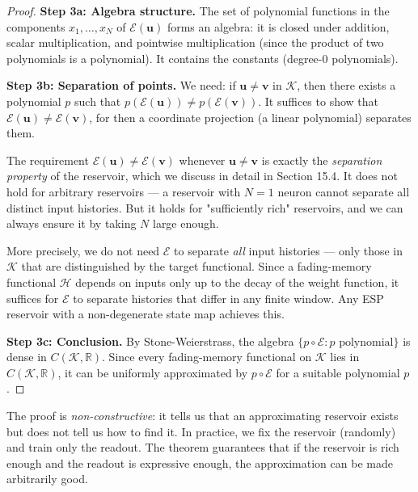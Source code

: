 \begin{proof}
\textbf{Step 3a: Algebra structure.} The set of polynomial functions in the components
$x_1, \ldots, x_N$ of $\mathcal{E}(\mathbf{u})$ forms an algebra: it is closed under
addition, scalar multiplication, and pointwise multiplication (since the product of
two polynomials is a polynomial). It contains the constants (degree-0 polynomials).

\textbf{Step 3b: Separation of points.} We need: if $\mathbf{u} \neq \mathbf{v}$ in
$\mathcal{K}$, then there exists a polynomial $p$ such that
$p(\mathcal{E}(\mathbf{u})) \neq p(\mathcal{E}(\mathbf{v}))$. It suffices to show
that $\mathcal{E}(\mathbf{u}) \neq \mathcal{E}(\mathbf{v})$, for then a coordinate
projection (a linear polynomial) separates them.

The requirement $\mathcal{E}(\mathbf{u}) \neq \mathcal{E}(\mathbf{v})$ whenever
$\mathbf{u} \neq \mathbf{v}$ is exactly the \textit{separation property} of the reservoir,
which we discuss in detail in Section 15.4. It does not hold for arbitrary reservoirs
--- a reservoir with $N = 1$ neuron cannot separate all distinct input histories. But
it holds for "sufficiently rich" reservoirs, and we can always ensure it by taking $N$
large enough.

More precisely, we do not need $\mathcal{E}$ to separate \textit{all} input histories --- only
those in $\mathcal{K}$ that are distinguished by the target functional. Since a
fading-memory functional $\mathcal{H}$ depends on inputs only up to the decay of the
weight function, it suffices for $\mathcal{E}$ to separate histories that differ in any
finite window. Any ESP reservoir with a non-degenerate state map achieves this.

\textbf{Step 3c: Conclusion.} By Stone-Weierstrass, the algebra $\{p \circ \mathcal{E} : p \text{ polynomial}\}$ is dense in $C(\mathcal{K}, \mathbb{R})$. Since every
fading-memory functional on $\mathcal{K}$ lies in $C(\mathcal{K}, \mathbb{R})$, it can be
uniformly approximated by $p \circ \mathcal{E}$ for a suitable polynomial $p$.
\end{proof}


\begin{remark}
The proof is \textit{non-constructive}: it tells us that an approximating
reservoir exists but does not tell us how to find it. In practice, we fix the reservoir
(randomly) and train only the readout. The theorem guarantees that if the reservoir is
rich enough and the readout is expressive enough, the approximation can be made
arbitrarily good.
\end{remark}


